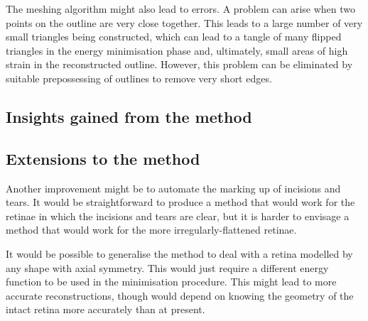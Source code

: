 \documentclass[10pt]{article}
\begin{document}
The meshing algorithm might also lead to errors. A problem can arise
when two points on the outline are very close together. This leads to
a large number of very small triangles being constructed, which can
lead to a tangle of many flipped triangles in the energy minimisation
phase and, ultimately, small areas of high strain in the reconstructed
outline. However, this problem can be eliminated by suitable
prepossessing of outlines to remove very short edges.

\subsection*{Insights gained from the method}


\subsection*{Extensions to the method}

Another improvement might be to automate the marking up of incisions
and tears. It would be straightforward to produce a method that would
work for the retinae in which the incisions and tears are clear, but
it is harder to envisage a method that would work for the more
irregularly-flattened retinae.

It would be possible to generalise the method to deal with a retina
modelled by any shape with axial symmetry. This would just require a
different energy function to be used in the minimisation
procedure. This might lead to more accurate reconstructions, though
would depend on knowing the geometry of the intact retina more
accurately than at present.




\end{document}
